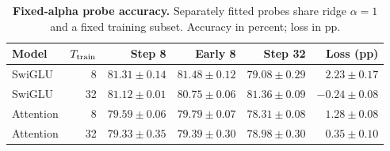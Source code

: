 \begin{table}[htbp]
\centering
\caption{\textbf{Fixed-alpha probe accuracy.} Separately fitted probes share ridge $\alpha=1$ and a fixed training subset. Accuracy in percent; loss in pp.}
\label{tab:modern_probes}
\small
\begin{tabular}{lrrrrr}
\toprule
Model & $T_{\rm train}$ & Step 8 & Early 8 & Step 32 & Loss (pp) \\
\midrule
SwiGLU & 8 & $81.31\pm0.14$ & $81.48\pm0.12$ & $79.08\pm0.29$ & $2.23\pm0.17$ \\
SwiGLU & 32 & $81.12\pm0.01$ & $80.75\pm0.06$ & $81.36\pm0.09$ & $-0.24\pm0.08$ \\
Attention & 8 & $79.59\pm0.06$ & $79.79\pm0.07$ & $78.31\pm0.08$ & $1.28\pm0.08$ \\
Attention & 32 & $79.33\pm0.35$ & $79.39\pm0.30$ & $78.98\pm0.30$ & $0.35\pm0.10$ \\
\bottomrule
\end{tabular}
\end{table}

